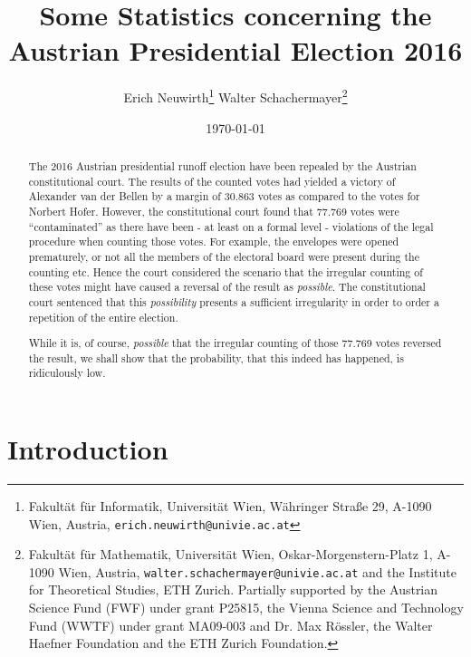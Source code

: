 \documentclass[12pt,a4paper]{article}
\theoremstyle{definition}
\begin{document}
\title{Some Statistics concerning the Austrian Presidential Election 2016}

\author{Erich Neuwirth\footnote{Fakult\"at f\"ur Informatik, Universit\"at Wien, W\"ahringer Stra{\ss}e 29, A-1090 Wien, Austria, {\tt erich.neuwirth@univie.ac.at}}
\hspace{20pt}Walter Schachermayer\footnote{Fakult\"at f\"ur Mathematik, Universit\"at Wien, Oskar-Morgenstern-Platz 1, A-1090 Wien, Austria, {\tt walter.schachermayer@univie.ac.at} and the Institute for Theoretical Studies, ETH Zurich. Partially supported by the Austrian Science Fund (FWF) under grant P25815, the Vienna Science and Technology Fund (WWTF) under grant MA09-003 and Dr. Max R\"ossler, the Walter Haefner Foundation and the ETH Zurich Foundation.}}

\date{\today}
\maketitle

\begin{abstract}
\noindent

The 2016 Austrian presidential runoff election have been repealed by the Austrian constitutional court. The results of the counted votes had yielded a victory of Alexander van der Bellen by a margin of 30.863 votes as compared to the votes for Norbert Hofer. However, the constitutional court found that 77.769 votes were ``contaminated'' as there have been - at least on a formal level - violations of the legal procedure when counting those votes. For example, the envelopes were opened prematurely, or not all the members of the electoral board were present during the counting etc. Hence the court considered the scenario that the irregular counting of these votes might have caused a reversal of the result as {\it possible}. The constitutional court sentenced that this {\it possibility} presents a sufficient irregularity in order to order a repetition of the entire election.

While it is, of course, {\it possible} that the irregular counting of those 77.769 votes reversed the result, we shall show that the probability, that this indeed has happened, is ridiculously low.
\end{abstract}


\section{Introduction}
\end{document}

